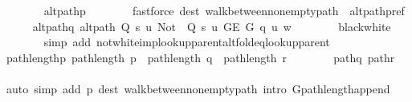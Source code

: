 \begin{isabellebody}
\ \ \ \ \ \ \isamarkupfalse%
\ alt{\isacharunderscore}{\kern0pt}path{\isacharunderscore}{\kern0pt}p\isanewline
\ \ \ \ \ \ \isamarkupfalse%
\ {\isacharparenleft}{\kern0pt}fastforce\ dest{\isacharcolon}{\kern0pt}\ walk{\isacharunderscore}{\kern0pt}between{\isacharunderscore}{\kern0pt}nonempty{\isacharunderscore}{\kern0pt}path{\isacharparenleft}{\kern0pt}{}{\isacharcomma}{\kern0pt}\ {}{\isacharparenright}{\kern0pt}\ alt{\isacharunderscore}{\kern0pt}path{\isacharunderscore}{\kern0pt}pref{\isacharunderscore}{\kern0pt}{}{\isacharparenright}{\kern0pt}\isanewline
\ \ \ \ \isamarkupfalse%
\ alt{\isacharunderscore}{\kern0pt}path{\isacharunderscore}{\kern0pt}q{\isacharcolon}{\kern0pt}\ {\isachardoublequoteopen}alt{\isacharunderscore}{\kern0pt}path\ {\isacharparenleft}{\kern0pt}Q\ s\ u{\isacharparenright}{\kern0pt}\ {\isacharparenleft}{\kern0pt}Not\ {\isasymcirc}\ Q\ s\ u{\isacharparenright}{\kern0pt}\ {\isacharparenleft}{\kern0pt}G{\isachardot}{\kern0pt}E\ G{\isacharparenright}{\kern0pt}\ q\ u\ w{\isachardoublequoteclose}\isanewline
\ \ \ \ \ \ \isamarkupfalse%
\ black{\isacharunderscore}{\kern0pt}white\isanewline
\ \ \ \ \ \ \isamarkupfalse%
\ {\isacharparenleft}{\kern0pt}simp\ add{\isacharcolon}{\kern0pt}\ not{\isacharunderscore}{\kern0pt}white{\isacharunderscore}{\kern0pt}imp{\isacharunderscore}{\kern0pt}lookup{\isacharunderscore}{\kern0pt}parent{\isacharunderscore}{\kern0pt}alt{\isacharunderscore}{\kern0pt}fold{\isacharunderscore}{\kern0pt}eq{\isacharunderscore}{\kern0pt}lookup{\isacharunderscore}{\kern0pt}parent{\isacharparenright}{\kern0pt}\isanewline
\ \ \ \ \isamarkupfalse%
\ path{\isacharunderscore}{\kern0pt}length{\isacharunderscore}{\kern0pt}p{\isacharcolon}{\kern0pt}\ {\isachardoublequoteopen}path{\isacharunderscore}{\kern0pt}length\ p\ {\isacharequal}{\kern0pt}\ path{\isacharunderscore}{\kern0pt}length\ q\ {\isacharplus}{\kern0pt}\ path{\isacharunderscore}{\kern0pt}length\ r{\isachardoublequoteclose}\isanewline
\ \ \ \ \ \ \isamarkupfalse%
\ path{\isacharunderscore}{\kern0pt}q\ path{\isacharunderscore}{\kern0pt}r\isanewline
\ \ \ \ \ \ \isamarkupfalse%
\ {\isacharparenleft}{\kern0pt}auto\ simp\ add{\isacharcolon}{\kern0pt}\ p\ dest{\isacharcolon}{\kern0pt}\ walk{\isacharunderscore}{\kern0pt}between{\isacharunderscore}{\kern0pt}nonempty{\isacharunderscore}{\kern0pt}path{\isacharparenleft}{\kern0pt}{}{\isacharminus}{\kern0pt}{}{\isacharparenright}{\kern0pt}\ intro{\isacharcolon}{\kern0pt}\ G{\isachardot}{\kern0pt}path{\isacharunderscore}{\kern0pt}length{\isacharunderscore}{\kern0pt}append{\isacharunderscore}{\kern0pt}{}{\isacharparenright}{\kern0pt}\isanewline

\end{isabellebody}
